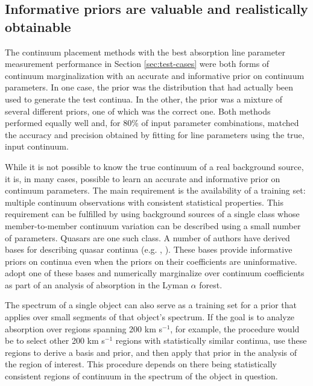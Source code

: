 \documentclass[manuscript]{aastex62}
\begin{document}
{\bf
\subsection{Informative priors are valuable and realistically obtainable}
\label{sec:discussion-informative-priors}
The continuum placement methods with the best absorption line parameter measurement performance in Section \ref{sec:test-cases} were both forms of continuum marginalization with an accurate and informative prior on continuum parameters.
In one case, the prior was the distribution that had actually been used to generate the test continua.
In the other, the prior was a mixture of several different priors, one of which was the correct one.
Both methods performed equally well and, for 80\% of input parameter combinations, matched the accuracy and precision obtained by fitting for line parameters using the true, input continuum.

While it is not possible to know the true continuum of a real background source, it is, in many cases, possible to learn an accurate and informative prior on continuum parameters.
The main requirement is the availability of a training set: multiple continuum observations with consistent statistical properties.
This requirement can be fulfilled by using background sources of a single class whose member-to-member continuum variation can be described using a small number of parameters.
Quasars are one such class.
A number of authors have derived bases for describing quasar continua (e.g. \citealt{2006ApJS..163..110S}, \citealt{2013ApJ...770..130Z}).
These bases provide informative priors on continua even when the priors on their coefficients are uninformative.
\citet{2017ApJ...844..136E} adopt one of these bases and numerically marginalize over continuum coefficients as part of an analysis of absorption in the Lyman $\alpha$ forest.

The spectrum of a single object can also serve as a training set for a prior that applies over small segments of that object's spectrum.
If the goal is to analyze absorption over regions spanning 200 km s$^{-1}$, for example, the procedure would be to select other 200 km s$^{-1}$ regions with statistically similar continua, use these regions to derive a basis and prior, and then apply that prior in the analysis of the region of interest.
This procedure depends on there being statistically consistent regions of continuum in the spectrum of the object in question.

}
\end{document}
